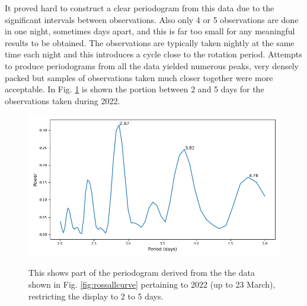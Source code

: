 It proved hard to construct a clear periodogram from this data due to the
significant intervals between observations. Also only 4 or 5 observations are done in one
night, sometimes days apart, and this is far too small for any meaningful
results to be obtained. The observations are typically taken nightly at
the same time each night and this introduces a cycle close to the
rotation period. Attempts to produce periodograms from all the data yielded
numerous peaks, very densely packed but samples of observations taken much
closer together were more acceptable. In Fig.
\ref{fig:rossallpgram} is shown the portion between 2 and 5 days for the observations taken during 2022.

\begin{figure}[!htbp]
\begin{center}
\includegraphics[scale=0.40]{REM/images/rem2022pgram.png} \\
\vspace{-.5cm}
\end{center}   
\caption{This shows part of the periodogram derived from the the data shown in
Fig. \ref{fig:rossallcurve} pertaining to 2022 (up
to 23 March), restricting the display to 2 to 5 days.}\protect\label{fig:rossallpgram}
\end{figure}

